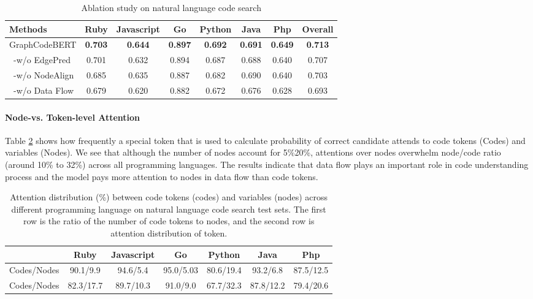 \documentclass{article} \usepackage{iclr2021_conference,times}
\begin{document}
\begin{table}[h]
	\begin{center}
		\begin{small}
			\begin{tabular}{lccccccc}
				\toprule
Methods & Ruby & Javascript & Go & Python & Java & Php & Overall\\
				\midrule
				GraphCodeBERT    & \bf{0.703}& \bf{0.644} & \bf{0.897}& \bf{0.692} & \bf{0.691} & \bf{0.649} & \bf{0.713} \\	
				 \ -w/o EdgePred   &0.701 &0.632 &0.894 & 0.687&0.688 &0.640 & 0.707
				\\				
				 \ -w/o  NodeAlign& 0.685 & 0.635& 0.887& 0.682& 0.690&0.640 &0.703
				\\
				 \ -w/o Data Flow   & 0.679& 0.620 & 0.882& 0.672 & 0.676 & 0.628 & 0.693				\\				

				\bottomrule
			\end{tabular}
        	\caption{Ablation study on natural language code search}
	\label{ablation_stdudy_search}
		\end{small}
	\end{center}
	\vskip -0.2in
\end{table}


\paragraph{Node-vs. Token-level Attention}
Table \ref{attention_distribution} shows how frequently a special token  that is used to calculate probability of correct candidate attends to code tokens (Codes) and variables (Nodes). We see that although the number of nodes account for 5\%20\%, attentions over nodes overwhelm node/code ratio (around 10\% to 32\%) across all programming languages. The results indicate that data flow plays an important role in code understanding process and the model pays more attention to nodes in data flow than code tokens. 
\begin{table}[h]
	\begin{center}
		\begin{small}
			\begin{tabular}{lcccccc}
				\toprule
& Ruby & Javascript & Go & Python & Java & Php\\
				\midrule
				Codes/Nodes   & 90.1/9.9 & 94.6/5.4 &95.0/5.03 & 80.6/19.4 &93.2/6.8 & 87.5/12.5\\		
				Codes/Nodes   & 82.3/17.7 & 89.7/10.3 &91.0/9.0 & 67.7/32.3 &87.8/12.2 &79.4/20.6\\
				\bottomrule
			\end{tabular}
	\caption{Attention distribution (\%) between code tokens (codes) and variables (nodes) across different programming language on natural language code search test sets. The first row is the ratio of the number of code tokens to nodes, and the second row is attention distribution of  token.}
	\label{attention_distribution}
		\end{small}
	\end{center}
	\vskip -0.2in	
\end{table}
\end{document}
